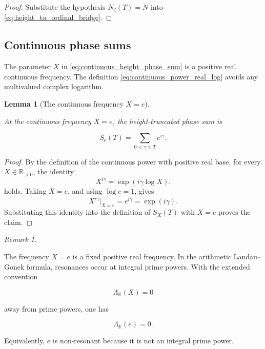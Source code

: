 \documentclass[11pt]{amsart}
\numberwithin{equation}{section}
\theoremstyle{plain}
\newtheorem{lemma}[theorem]{Lemma}
\theoremstyle{definition}
\theoremstyle{remark}
\newtheorem{remark}[theorem]{Remark}
\begin{document}
\begin{proof}
Substitute the hypothesis \(N_\zeta(T)=N\) into
\eqref{eq:height_to_ordinal_bridge}.
\end{proof}

\subsection{Continuous phase sums}
\label{subsec:continuous_phase_sums}

The parameter \(X\) in \eqref{eq:continuous_height_phase_sum} is a
positive real continuous frequency. The definition
\eqref{eq:continuous_power_real_log} avoids any multivalued complex
logarithm.

\begin{lemma}[The continuous frequency \(X=e\)]
\label{lem:e_continuous_frequency_phase}

At the continuous frequency \(X=e\), the height-truncated phase sum is

\begin{equation}
S_e(T)
=
\sum_{0<\gamma\leq T}e^{i\gamma}.
\label{eq:e_continuous_frequency_phase_sum}
\end{equation}

\end{lemma}

\begin{proof}
By the definition of the continuous power with positive real base, for every
\(X\in\mathbb{R}_{>0}\), the identity
\begin{equation}
X^{i\gamma}
=
\exp(i\gamma\log X).
\label{eq:continuous_power_identity_in_e_lemma}
\end{equation}
holds. Taking \(X=e\), and using \(\log e=1\), gives
\begin{equation}
X^{i\gamma}\big|_{X=e}
=
e^{i\gamma}
=
\exp(i\gamma).
\label{eq:e_frequency_power_evaluation}
\end{equation}
Substituting this identity into the definition of \(S_X(T)\) with \(X=e\)
proves the claim.
\end{proof}

\begin{remark}
\label{rem:continuous_not_arithmetic_frequency}

The frequency \(X=e\) is a fixed positive real frequency. In the
arithmetic Landau--Gonek formula, resonances occur at integral prime
powers. With the extended convention

\begin{equation}
\Lambda_{\mathbb R}(X)=0
\end{equation}

away from prime powers, one has

\begin{equation}
\Lambda_{\mathbb R}(e)=0.
\end{equation}

Equivalently, \(e\) is non-resonant because it is not an integral prime
power.
\end{remark}
\end{document}
